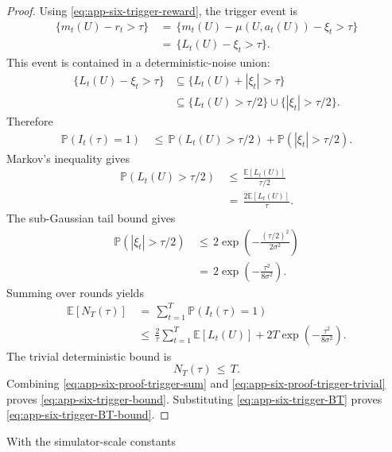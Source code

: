 \documentclass{article} %
\begin{document}
\begin{proof}
Using \eqref{eq:app-six-trigger-reward}, the trigger event is
\begin{align}
\label{eq:app-six-proof-trigger-event}
\{m_t(U)-r_t>\tau\}
&\,=\,
\{m_t(U)-\mu(U,a_t(U))-\xi_t>\tau\}
\\
&\,=\,
\{L_t(U)-\xi_t>\tau\}.
\end{align}
This event is contained in a deterministic-noise union:
\begin{align}
\label{eq:app-six-proof-trigger-union}
\{L_t(U)-\xi_t>\tau\}
&\subseteq
\{L_t(U)+|\xi_t|>\tau\}
\\
&\subseteq
\{L_t(U)>\tau/2\}
\cup
\{|\xi_t|>\tau/2\}.
\end{align}
Therefore
\begin{align}
\label{eq:app-six-proof-trigger-prob}
\mathbb{P}(I_t(\tau)=1)
&\,\le\,
\mathbb{P}(L_t(U)>\tau/2)
+
\mathbb{P}(|\xi_t|>\tau/2).
\end{align}
Markov's inequality gives
\begin{align}
\label{eq:app-six-proof-markov}
\mathbb{P}(L_t(U)>\tau/2)
&\,\le\,
\frac{\mathbb{E}[L_t(U)]}{\tau/2}
\\
&\,=\,
\frac{2\mathbb{E}[L_t(U)]}{\tau}.
\end{align}
The sub-Gaussian tail bound gives
\begin{align}
\label{eq:app-six-proof-subg-tail}
\mathbb{P}(|\xi_t|>\tau/2)
&\,\le\,
2\exp\!\left(
-\frac{(\tau/2)^2}{2\sigma^2}
\right)
\\
&\,=\,
2\exp\!\left(
-\frac{\tau^2}{8\sigma^2}
\right).
\end{align}
Summing over rounds yields
\begin{align}
\label{eq:app-six-proof-trigger-sum}
\mathbb{E}[N_T(\tau)]
&\,=\,
\sum_{t=1}^{T}\mathbb{P}(I_t(\tau)=1)
\\
&\,\le\,
\frac{2}{\tau}\sum_{t=1}^{T}\mathbb{E}[L_t(U)]
+
2T\exp\!\left(-\frac{\tau^2}{8\sigma^2}\right).
\end{align}
The trivial deterministic bound is
\begin{equation}
\label{eq:app-six-proof-trigger-trivial}
N_T(\tau)\,\le\, T.
\end{equation}
Combining \eqref{eq:app-six-proof-trigger-sum} and \eqref{eq:app-six-proof-trigger-trivial} proves \eqref{eq:app-six-trigger-bound}.  Substituting \eqref{eq:app-six-trigger-BT} proves \eqref{eq:app-six-trigger-BT-bound}.
\end{proof}

With the simulator-scale constants
\end{document}
